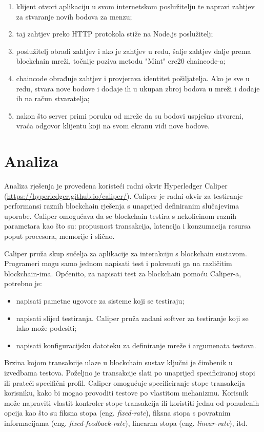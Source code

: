 \documentclass[times, utf8, diplomski]{fer}
\begin{document}
\begin{enumerate}
\item klijent otvori aplikaciju u svom internetskom poslužitelju te napravi zahtjev za stvaranje novih bodova za menzu;
\item taj zahtjev preko HTTP protokola stiže na Node.js poslužitelj;
\item poslužitelj obradi zahtjev i ako je zahtjev u redu, šalje zahtjev dalje prema blockchain mreži, točnije poziva metodu "Mint" erc20 chaincode-a;
\item chaincode obrađuje zahtjev i provjerava identitet pošiljatelja. Ako je sve u redu, stvara nove bodove i dodaje ih u ukupan zbroj bodova u mreži i dodaje ih na račun stvaratelja;
\item nakon što server primi poruku od mreže da su bodovi uspješno stvoreni, vraća odgovor klijentu koji na svom ekranu vidi nove bodove.
\end{enumerate}

\section{Analiza}

Analiza rješenja je provedena koristeći radni okvir Hyperledger Caliper (\url{https://hyperledger.github.io/caliper/}).  Caliper je radni okvir za testiranje performansi raznih blockchain rješenja s unaprijed definiranim slučajevima uporabe.  Caliper omogućava da se blockchain testira s nekolicinom raznih parametara kao što su: propusnost transakcija,  latencija i konzumacija resursa poput procesora, memorije i slično.

Caliper pruža skup sučelja za aplikacije za interakciju s blockchain sustavom. Programeri mogu samo jednom napisati test i pokrenuti ga na različitim blockchain-ima.  Općenito,  za napisati test za blockchain pomoću Caliper-a, potrebno je:
\begin{itemize}

\item napisati pametne ugovore za sisteme koji se testiraju;
\item napisati slijed testiranja. Caliper pruža zadani softver za testiranje koji se lako može podesiti;
\item napisati konfiguracijsku datoteku za definiranje mreže i argumenata testova.

\end{itemize}

Brzina kojom transakcije ulaze u blockchain sustav ključni je čimbenik u izvedbama testova.  Poželjno je transakcije slati po unaprijed specificiranoj stopi ili prateći specifični profil. Caliper omogućuje specificiranje stope transakcija korisniku, kako bi mogao provoditi testove po vlastitom mehanizmu. Korisnik može napraviti vlastit kontroler stope transakcija ili koristiti jednu od ponuđenih opcija kao što su fiksna stopa (eng. \textit{fixed-rate}),  fiksna stopa s povratnim informacijama (eng. \textit{fixed-feedback-rate}), linearna stopa (eng. \textit{linear-rate}),  itd.
\end{document}
